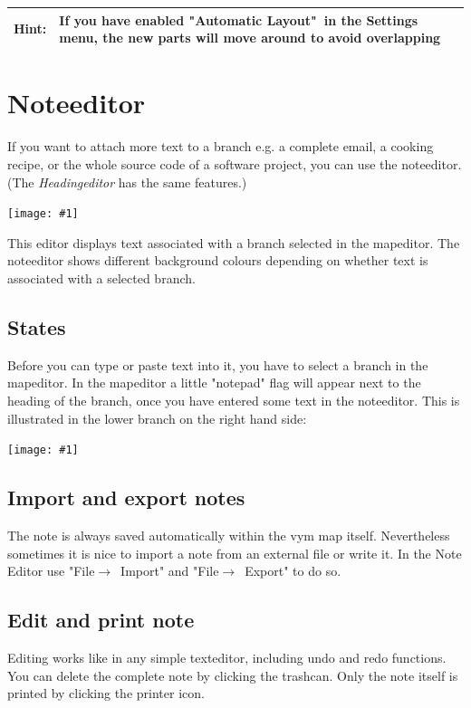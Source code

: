 \documentclass[12pt,a4paper]{article}
\newcommand{\maximage}[1]{  
    \begin{center}
        \texttt{[image: \#1]} 
    \end{center}
}
\newcommand{\hint}[1]{
    \begin{center} 
        \begin{tabular}{|rp{12cm}|} \hline
            {\bf Hint}:& #1\\   \hline
        \end{tabular}
            \marginpar{\Huge !} 
    \end{center} 
}
\newcommand{\vym}{{\sc vym }}
\newcommand{\ra}{$\longrightarrow$}
\begin{document}
\hint{If you have enabled "Automatic Layout"\ in the Settings menu,
the new parts will move around to avoid overlapping}



\section{Noteeditor} \label {noteeditor}
If you want to attach more text to a branch e.g. a complete email, a
cooking recipe, or the whole source code of a software project, you can
use the noteeditor. (The {\em Headingeditor} has the same features.)
    \maximage{images/noteeditor.png}
This editor displays text associated with a branch selected in the
mapeditor. The noteeditor shows different background colours
depending on whether text is associated with a selected branch.

\subsection{States}
Before you can type or paste text into it, you have
to select a branch in the mapeditor.
In the mapeditor a little "notepad" flag will appear
next to the heading of the branch, once you have entered some text in
the noteeditor. This is illustrated in the lower
branch on the right hand side: 
\maximage{images/branches-flags.png}

\subsection{Import and export notes}
The note is always saved automatically within the \vym map itself.
Nevertheless sometimes it is nice to import a note from an external file
or write it. In the Note Editor use "File\ra~Import" and
"File\ra~Export" to do so. 

\subsection{Edit and print note}
Editing works like in any simple texteditor, including undo and redo
functions. You can delete the complete note by clicking the trashcan.
Only the note itself is printed by clicking the printer icon.
\end{document}
